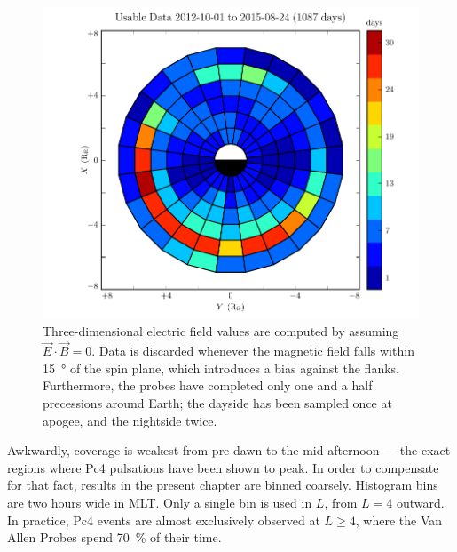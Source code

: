 \begin{figure}[!htb]
    \centering
    \includegraphics[width=\textwidth]{figures/pos_all_sharp.pdf}
    \caption[Distribution of Usable Van Allen Probe Data: Fine Resolution]{
      Three-dimensional electric field values are computed by assuming $\vec{E} \cdot \vec{B} = 0$. Data is discarded whenever the magnetic field falls within \SI{15}{\degree} of the spin plane, which introduces a bias against the flanks. Furthermore, the probes have completed only one and a half precessions around Earth; the dayside has been sampled once at apogee, and the nightside twice. 
    }
    \label{fig_pos_all_sharp}
\end{figure}

Awkwardly, coverage is weakest from pre-dawn to the mid-afternoon --- the exact regions where Pc4 pulsations have been shown to peak. In order to compensate for that fact, results in the present chapter are binned coarsely. Histogram bins are two hours wide in MLT. Only a single bin is used in $L$, from $L = 4$ outward. In practice, Pc4 events are almost exclusively observed at $L \geq 4$, where the Van Allen Probes spend \SI{70}{\percent} of their time. 



